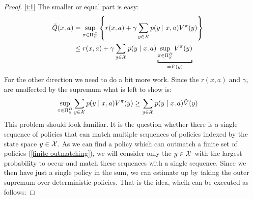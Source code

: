 \begin{proof} \ref{i:1} The smaller or equal part is easy:
	\begin{align*}
		\tilde{Q}(x,a)&= \sup_{\pi \in \detPolicy} \left\{r(x,a)
		+\gamma\sum_{y\in\cX}p(y\mid x,a) V^\pi(y)\right\}\\
		&\le r(x,a) +\gamma\sum_{y\in\cX}p(y\mid x,a) \underbracket{\sup_{\pi \in \detPolicy}V^\pi(y)}_{=\tilde{V}(y)}
	\end{align*}
	For the other direction we need to do a bit more work. Since the \(r(x,a)\) and \(\gamma\), are unaffected by the supremum what is left to show is:
	\[
		\sup_{\pi \in \Pi_S^D}\sum_{y\in\mathcal{X}}p(y\mid x,a) V^\pi(y)
		\ge\sum_{y\in\mathcal{X}}p(y\mid x,a)\tilde{V}(y)
	\]
	This problem should look familiar. It is the question whether there is a single sequence of policies that can match multiple sequences of policies indexed by the state space \(y\in\mathcal{X}\).	As we can find a policy which can outmatch a finite set of policies (\ref{finite outmatching}), we will consider only the \(y\in\mathcal{X}\) with the largest probability to occur and match these sequences with a single sequence. Since we then have just a single policy in the sum, we can estimate up by taking the outer supremum over deterministic policies. That is the idea, whcih can be executed as follows:
	

\end{proof}
